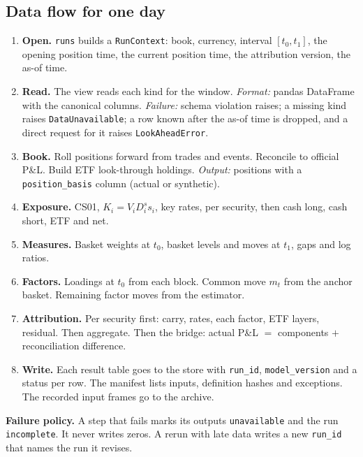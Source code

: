 \documentclass[11pt,a4paper]{article}
\newcommand{\code}[1]{\texttt{\small #1}}
\begin{document}
\subsection{Data flow for one day}
\begin{enumerate}
\item \textbf{Open.} \code{runs} builds a \code{RunContext}: book, currency, interval $[t_0,t_1]$, the opening position time, the current position time, the attribution version, the as-of time.
\item \textbf{Read.} The view reads each kind for the window. \emph{Format:} pandas DataFrame with the canonical columns. \emph{Failure:} schema violation raises; a missing kind raises \code{DataUnavailable}; a row known after the as-of time is dropped, and a direct request for it raises \code{LookAheadError}.
\item \textbf{Book.} Roll positions forward from trades and events. Reconcile to official P\&L. Build ETF look-through holdings. \emph{Output:} positions with a \code{position\_basis} column (actual or synthetic).
\item \textbf{Exposure.} CS01, $K_i = V_i D^s_i s_i$, key rates, per security, then cash long, cash short, ETF and net.
\item \textbf{Measures.} Basket weights at $t_0$, basket levels and moves at $t_1$, gaps and log ratios.
\item \textbf{Factors.} Loadings at $t_0$ from each block. Common move $m_t$ from the anchor basket. Remaining factor moves from the estimator.
\item \textbf{Attribution.} Per security first: carry, rates, each factor, ETF layers, residual. Then aggregate. Then the bridge: actual P\&L $=$ components $+$ reconciliation difference.
\item \textbf{Write.} Each result table goes to the store with \code{run\_id}, \code{model\_version} and a status per row. The manifest lists inputs, definition hashes and exceptions. The recorded input frames go to the archive.
\end{enumerate}
\textbf{Failure policy.} A step that fails marks its outputs \code{unavailable} and the run \code{incomplete}. It never writes zeros. A rerun with late data writes a new \code{run\_id} that names the run it revises.
\end{document}
